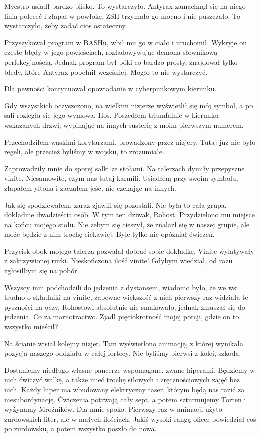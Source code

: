\divider{}

Myestro usiadł bardzo blisko.
To wystarczyło.
Antyrax zamachnął się na niego linią poleceć i złapał w powłokę.
ZSH trzymało go mocno i nie puszczało.
To wystarczyło, żeby zadać cios ostateczny.

Przyszykował program w BASHu, wbił mu go w ciało i uruchomił.
Wykryje on częste błędy w jego powieściach, rozładowywując demona słownikową perfekcyjnością.
Jednak program był póki co bardzo prosty, znajdował tylko błędy, które Antyrax popełnił wcześniej.
Mogło to nie wystarczyć.

Dla pewności kontynuował opowiadanie w cyberpunkowym kierunku.

\divider{}

Gdy wszystkich oczyszczono, na wielkim nizjerze wyświetlił się mój symbol, a po sali rozległa się jego wymowa.
Hos.
Poszedłem triumfalnie w kierunku wskazanych drzwi, wypinając na innych susterię z moim pierwszym numerem.

Przechodziłem wąskimi korytarzami, prowadzony przez nizjery. 
Tutaj już nie było regeli, ale przecież byliśmy w wojsku, to zrozumiałe.

Zaprowadziły mnie do sporej salki ze stołami.
Na talerzach dymiły przepyszne vinite.
Niesamowite, czym nas tutaj karmili.
Usiadłem przy swoim symbolu, złapałem yltona i zacząłem jeść, nie czekając na innych.

Jak się spodziewałem, zaraz zjawili się pozostali.
Nie była to cała grupa, dokładnie dwadzieścia osób.
W tym ten dziwak, Rohost.
Przydzielono mu miejsce na końcu mojego stołu.
Nie żebym się cieszył, że znalazł się w naszej grupie, ale może będzie z nim trochę ciekawiej.
Byle tylko nie opóźniał ćwiczeń.

Przycisk obok mojego talerza pozwalał dobrać sobie dokładkę.
Vinite wylatywały z zakrzywionej rurki.
Nieskończona ilość vinite! Gdybym wiedział, od razu zgłosiłbym się na pobór.

Wszyscy inni podchodzili do jedzenia z dystansem, wiadomo było, że we wsi trudno o składniki na vinite, zapewne większość z nich pierwszy raz widziała te pyszności na oczy.
Rohostowi absolutnie nie smakowało, jednak zmuszał się do jedzenia.
Co za marnotractwo.
Zjadł pięciokrotność mojej porcji, gdzie on to wszystko mieścił?

Na ścianie wisiał kolejny nizjer.
Tam wyświetlono animację, z której wynikała pozycja naszego oddziału w całej fortecy. Nie byliśmy pierwsi z kolei, szkoda.

Dostaniemy niedługo własne pancerze wspomagane, zwane hiperami.
Będziemy w nich ćwiczyć walkę, a także mieć trochę siłowych i zręcznościowych zajęć bez nich.
Każdy hiper ma wbudowany elektryczny taser, którym będą nas razić za niesubordynację.
Ćwiczenia potrwają cały sept, a potem szturmujemy Torten i wyżynamy Mroźników.
Dla mnie spoko.
Pierwszy raz w animacji użyto zurdowskich liter, ale w małych ilościach.
Jakiś wysoki rangą oficer powiedział coś po zurdowsku, a potem wszystko poszło do nowa.

